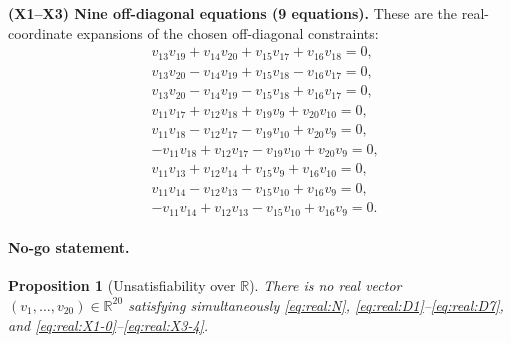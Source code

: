 \documentclass[11pt]{article}
\newtheorem{proposition}{Proposition}
\begin{document}
\smallskip
\noindent\textbf{(X1--X3) Nine off-diagonal equations (9 equations).}
These are the real-coordinate expansions of the chosen off-diagonal constraints:
\begin{align}
&v_{13}v_{19}+v_{14}v_{20}+v_{15}v_{17}+v_{16}v_{18}=0,
\tag{X1-0}\label{eq:real:X1-0}\\
&v_{13}v_{20}-v_{14}v_{19}+v_{15}v_{18}-v_{16}v_{17}=0,
\tag{X1-2}\label{eq:real:X1-2}\\
&v_{13}v_{20}-v_{14}v_{19}-v_{15}v_{18}+v_{16}v_{17}=0,
\tag{X1-4}\label{eq:real:X1-4}\\[1mm]
&v_{11}v_{17}+v_{12}v_{18}+v_{19}v_{9}+v_{20}v_{10}=0,
\tag{X2-0}\label{eq:real:X2-0}\\
&v_{11}v_{18}-v_{12}v_{17}-v_{19}v_{10}+v_{20}v_{9}=0,
\tag{X2-1}\label{eq:real:X2-1}\\
&-v_{11}v_{18}+v_{12}v_{17}-v_{19}v_{10}+v_{20}v_{9}=0,
\tag{X2-4}\label{eq:real:X2-4}\\[1mm]
&v_{11}v_{13}+v_{12}v_{14}+v_{15}v_{9}+v_{16}v_{10}=0,
\tag{X3-0}\label{eq:real:X3-0}\\
&v_{11}v_{14}-v_{12}v_{13}-v_{15}v_{10}+v_{16}v_{9}=0,
\tag{X3-1}\label{eq:real:X3-1}\\
&-v_{11}v_{14}+v_{12}v_{13}-v_{15}v_{10}+v_{16}v_{9}=0.
\tag{X3-4}\label{eq:real:X3-4}
\end{align}

\paragraph{No-go statement.}
\begin{proposition}[Unsatisfiability over $\mathbb R$]
\label{prop:real-unsat-subsystem}
There is no real vector $(v_1,\dots,v_{20})\in\mathbb R^{20}$ satisfying simultaneously
\eqref{eq:real:N}, \eqref{eq:real:D1}--\eqref{eq:real:D7}, and \eqref{eq:real:X1-0}--\eqref{eq:real:X3-4}.
\end{proposition}
\end{document}
